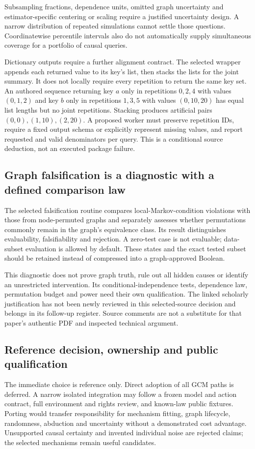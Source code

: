 Subsampling fractions, dependence units, omitted graph uncertainty and
estimator-specific centering or scaling require a justified uncertainty
design. A narrow distribution of repeated simulations cannot settle those
questions. Coordinatewise percentile intervals also do not automatically
supply simultaneous coverage for a portfolio of causal queries.
\citep{exec24_gcm_choice}

Dictionary outputs require a further alignment contract. The selected
wrapper appends each returned value to its key's list, then stacks the
lists for the joint summary. It does not locally require every repetition
to return the same key set. An authored sequence returning key $a$ only
in repetitions $0,2,4$ with values $(0,1,2)$ and key $b$ only in
repetitions $1,3,5$ with values $(0,10,20)$ has equal list lengths but
no joint repetitions. Stacking produces artificial pairs
$(0,0),(1,10),(2,20)$. A proposed worker must preserve repetition IDs,
require a fixed output schema or explicitly represent missing values,
and report requested and valid denominators per query. This is a
conditional source deduction, not an executed package failure.
\citep{exec24_gcm_source,exec24_gcm_choice}

\subsection{Graph falsification is a diagnostic with a defined comparison law}
The selected falsification routine compares local-Markov-condition
violations with those from node-permuted graphs and separately assesses
whether permutations commonly remain in the graph's equivalence class.
Its result distinguishes evaluability, falsifiability and rejection.
A zero-test case is not evaluable; data-subset evaluation is allowed by
default. These states and the exact tested subset should be retained
instead of compressed into a graph-approved Boolean.
\citep{exec24_gcm_source}

This diagnostic does not prove graph truth, rule out all hidden causes
or identify an unrestricted intervention. Its conditional-independence
tests, dependence law, permutation budget and power need their own
qualification. The linked scholarly justification has not been newly
reviewed in this selected-source decision and belongs in its follow-up
register. Source comments are not a substitute for that paper's authentic
PDF and inspected technical argument.~\citep{exec24_gcm_choice}

\subsection{Reference decision, ownership and public qualification}
The immediate choice is reference only. Direct adoption of all GCM paths
is deferred. A narrow isolated integration may follow a frozen model and
action contract, full environment and rights review, and known-law public
fixtures. Porting would transfer responsibility for mechanism fitting,
graph lifecycle, randomness, abduction and uncertainty without a demonstrated
cost advantage. Unsupported causal certainty and invented individual noise
are rejected claims; the selected mechanisms remain useful candidates.
\citep{exec24_gcm_choice}

